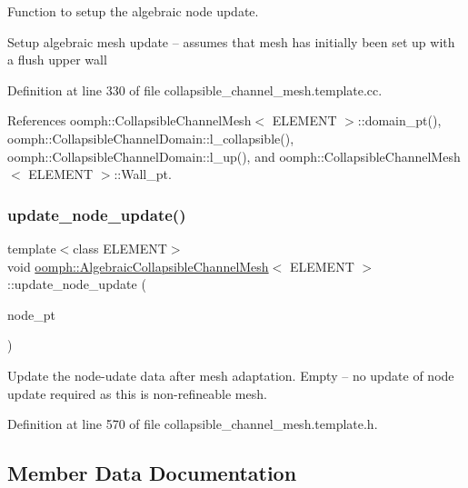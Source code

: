 Function to setup the algebraic node update. 

Setup algebraic mesh update -- assumes that mesh has initially been set up with a flush upper wall 

Definition at line 330 of file collapsible\+\_\+channel\+\_\+mesh.\+template.\+cc.



References oomph\+::\+Collapsible\+Channel\+Mesh$<$ E\+L\+E\+M\+E\+N\+T $>$\+::domain\+\_\+pt(), oomph\+::\+Collapsible\+Channel\+Domain\+::l\+\_\+collapsible(), oomph\+::\+Collapsible\+Channel\+Domain\+::l\+\_\+up(), and oomph\+::\+Collapsible\+Channel\+Mesh$<$ E\+L\+E\+M\+E\+N\+T $>$\+::\+Wall\+\_\+pt.

\mbox{\label{classoomph_1_1AlgebraicCollapsibleChannelMesh_abad38fb50d067a126af1161a3a603972}} 
\subsubsection{\texorpdfstring{update\+\_\+node\+\_\+update()}{update\_node\_update()}}
{\footnotesize\ttfamily template$<$class E\+L\+E\+M\+E\+NT$>$ \\
void \hyperlink{classoomph_1_1AlgebraicCollapsibleChannelMesh}{oomph\+::\+Algebraic\+Collapsible\+Channel\+Mesh}$<$ E\+L\+E\+M\+E\+NT $>$\+::update\+\_\+node\+\_\+update (\begin{DoxyParamCaption}\item[{Algebraic\+Node $\ast$\&}]{node\+\_\+pt }\end{DoxyParamCaption})\hspace{0.3cm}{\ttfamily [inline]}}



Update the node-\/udate data after mesh adaptation. Empty -- no update of node update required as this is non-\/refineable mesh. 



Definition at line 570 of file collapsible\+\_\+channel\+\_\+mesh.\+template.\+h.



\subsection{Member Data Documentation}
\mbox{\label{classoomph_1_1AlgebraicCollapsibleChannelMesh_ab3848ae5c357f45addf4bcfeca1a9d18}} 
